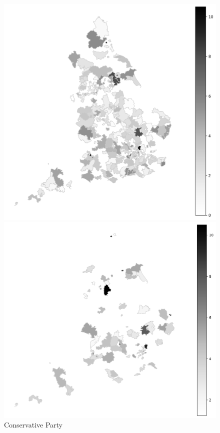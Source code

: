 \documentclass[preprint]{elsarticle} %
\begin{document}
\begin{figure}[htbp]  %
	\centering
	
	\begin{minipage}[t]{0.335\textwidth}
		\centering
		\includegraphics[width=\textwidth,height=0.68\textheight,keepaspectratio]{plots/ConservativeParty_2010GeneralElection_Environmental_Mentions.png}
		\caption{Conservative Party}
	\end{minipage}\hfill
	\begin{minipage}[t]{0.335\textwidth}
		\centering
		\includegraphics[width=\textwidth,height=0.68\textheight,keepaspectratio]{plots/GreenParty_2010GeneralElection_Environmental_Mentions.png}

\end{minipage}
\end{figure}
\end{document}

